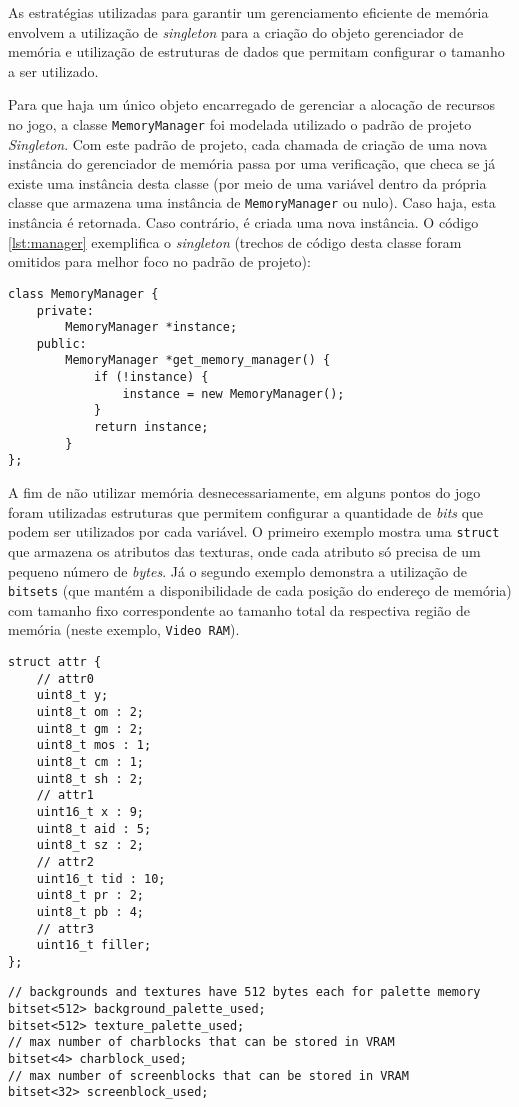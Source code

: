     As estratégias utilizadas para garantir um gerenciamento eficiente de memória envolvem a utilização de \textit{singleton} para a criação do objeto gerenciador de memória e utilização de estruturas de dados que permitam configurar o tamanho a ser utilizado.

    Para que haja um único objeto encarregado de gerenciar a alocação de recursos no jogo, a classe \texttt{MemoryManager} foi modelada utilizado o padrão de projeto \textit{Singleton}. Com este padrão de projeto, cada chamada de criação de uma nova instância do gerenciador de memória passa por uma verificação, que checa se já existe uma instância desta classe (por meio de uma variável dentro da própria classe que armazena uma instância de \texttt{MemoryManager} ou nulo). Caso haja, esta instância é retornada. Caso contrário, é criada uma nova instância. O código \ref{lst:manager} exemplifica o \textit{singleton} (trechos de código desta classe foram omitidos para melhor foco no padrão de projeto):

\begin{lstlisting}[caption={\textit{Singleton} do gerenciador de memória.},label={lst:manager}]
class MemoryManager {
    private:
        MemoryManager *instance;
    public:
        MemoryManager *get_memory_manager() {
            if (!instance) {
                instance = new MemoryManager();
            }
            return instance;
        }
};
\end{lstlisting}

A fim de não utilizar memória desnecessariamente, em alguns pontos do jogo foram utilizadas estruturas que permitem configurar a quantidade de \textit{bits} que podem ser utilizados por cada variável. O primeiro exemplo mostra uma \texttt{struct} que armazena os atributos das texturas, onde cada atributo só precisa de um pequeno número de \textit{bytes}. Já o segundo exemplo demonstra a utilização de \texttt{bitsets} (que mantém a disponibilidade de cada posição do endereço de memória) com tamanho fixo correspondente ao tamanho total da respectiva região de memória (neste exemplo, \texttt{Video RAM}).

\begin{lstlisting}[float,caption={\texttt{Struct} com \texttt{bitfields} para atributos das texturas.}]
struct attr {
    // attr0
    uint8_t y;
    uint8_t om : 2;
    uint8_t gm : 2;
    uint8_t mos : 1;
    uint8_t cm : 1;
    uint8_t sh : 2;
    // attr1
    uint16_t x : 9;
    uint8_t aid : 5;
    uint8_t sz : 2;
    // attr2
    uint16_t tid : 10;
    uint8_t pr : 2;
    uint8_t pb : 4;
    // attr3
    uint16_t filler;
};
\end{lstlisting}

\begin{lstlisting}[float,caption={\textit{Bitsets} para checagem de disponibilidade na memória.}]
// backgrounds and textures have 512 bytes each for palette memory
bitset<512> background_palette_used;
bitset<512> texture_palette_used;
// max number of charblocks that can be stored in VRAM
bitset<4> charblock_used;
// max number of screenblocks that can be stored in VRAM
bitset<32> screenblock_used;
\end{lstlisting}
